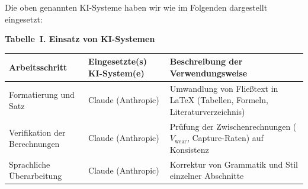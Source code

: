 \documentclass[conference,a4paper]{IEEEtran}
\begin{document}
Die oben genannten KI-Systeme haben wir wie im Folgenden dargestellt eingesetzt:
 
\vspace{0.5em}
\noindent\textbf{Tabelle~I. Einsatz von KI-Systemen}
 
\vspace{0.3em}
\noindent
\begin{tabular}{|p{}|p{}|p{}|}
\hline
\textbf{Arbeitsschritt} & \textbf{Eingesetzte(s) KI-System(e)} & \textbf{Beschreibung der Verwendungsweise} \\
\hline
Formatierung und Satz & Claude (Anthropic) & Umwandlung von Fließtext in \LaTeX{} (Tabellen, Formeln, Literaturverzeichnis) \\[4ex]
\hline
Verifikation der Berechnungen & Claude (Anthropic) & Prüfung der Zwischenrechnungen ($V_{\mathrm{wear}}$, Capture-Raten) auf Konsistenz \\[4ex]
\hline
Sprachliche Überarbeitung & Claude (Anthropic) & Korrektur von Grammatik und Stil einzelner Abschnitte \\[4ex]
\hline
\end{tabular}
 
\end{document}
